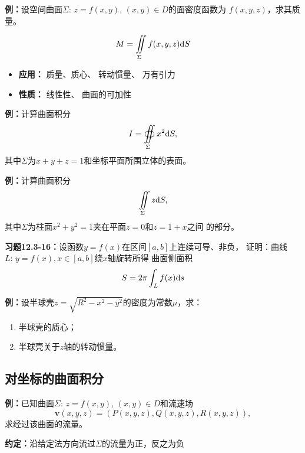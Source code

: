 {\bf 例：}设空间曲面$\Sigma:\,z=f(x,y),\,(x,y)\in D$的面密度函数为
$f(x,y,z)$，求其质量。

$${M=\iint\limits_{\Sigma}f(x,y,z)\mathrm{d} S}$$

\begin{itemize}
  \setlength{\itemindent}{1cm}
  \item {\bf 应用：} 质量、质心、 转动惯量、 万有引力 
  \item {\bf 性质：} 线性性、 曲面的可加性
\end{itemize}

{\bf 例：}计算曲面积分
$$I=\oiint\limits_{\Sigma}x^2\mathrm{d} S,$$
其中$\Sigma$为$x+y+z=1$和坐标平面所围立体的表面。


{\bf 例：}计算曲面积分
$$\iint\limits_{\Sigma}z\mathrm{d} S,$$
其中$\Sigma$为柱面$x^2+y^2=1$夹在平面$z=0$和$z=1+x$之间
的部分。

{\bf
习题12.3-16：}设函数$y=f(x)$在区间$[a,b]$上连续可导、非负，
证明：曲线$L:\,y=f(x),x\in[a,b]$绕$x$轴旋转所得 曲面侧面积
$$S=2\pi\displaystyle\int_Lf(x)\mathrm{d} s$$

{\bf 例：}设半球壳$z=\sqrt{R^2-x^2-y^2}$的密度为常数$\mu$，求：
\begin{enumerate}[(1)]
  \setlength{\itemindent}{1cm}
  \item 半球壳的质心；
  \item 半球壳关于$z$轴的转动惯量。
\end{enumerate}

\subsection{对坐标的曲面积分}

{\bf 例：}已知曲面$\Sigma:\,z=f(x,y),\,(x,y)\in D$和流速场
$$\bm{v}(x,y,z)=(P(x,y,z),Q(x,y,z),R(x,y,z)),$$
求经过该曲面的流量。

{\bf 约定：}沿给定法方向流过$\Sigma$的流量为正，反之为负

